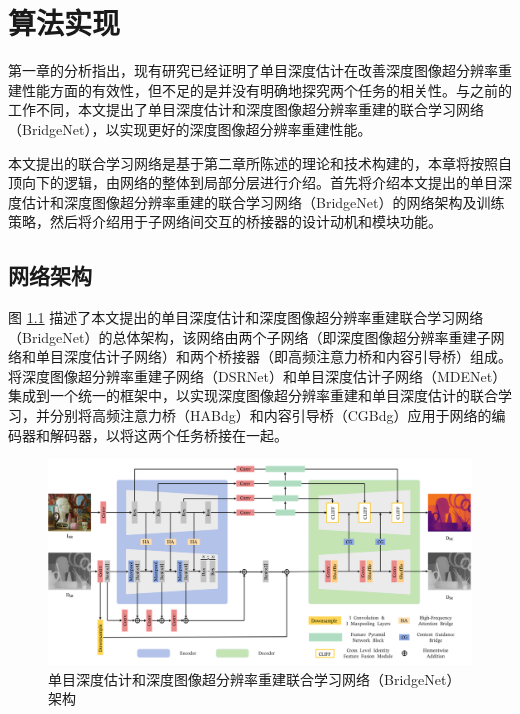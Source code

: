 \chapter{算法实现}

第一章的分析指出，现有研究已经证明了单目深度估计在改善深度图像超分辨率重建性能方面的有效性，但不足的是并没有明确地探究两个任务的相关性。与之前的工作不同，本文提出了单目深度估计和深度图像超分辨率重建的联合学习网络（BridgeNet），以实现更好的深度图像超分辨率重建性能。

本文提出的联合学习网络是基于第二章所陈述的理论和技术构建的，本章将按照自顶向下的逻辑，由网络的整体到局部分层进行介绍。首先将介绍本文提出的单目深度估计和深度图像超分辨率重建的联合学习网络（BridgeNet）的网络架构及训练策略，然后将介绍用于子网络间交互的桥接器的设计动机和模块功能。

\section{网络架构}

图 \ref{fig:fig3-1} 描述了本文提出的单目深度估计和深度图像超分辨率重建联合学习网络（BridgeNet）的总体架构，该网络由两个子网络（即深度图像超分辨率重建子网络和单目深度估计子网络）和两个桥接器（即高频注意力桥和内容引导桥）组成。将深度图像超分辨率重建子网络（DSRNet）和单目深度估计子网络（MDENet）集成到一个统一的框架中，以实现深度图像超分辨率重建和单目深度估计的联合学习，并分别将高频注意力桥（HABdg）和内容引导桥（CGBdg）应用于网络的编码器和解码器，以将这两个任务桥接在一起。

\begin{figure}[!htbp]
	\centering
	\includegraphics{figures/17.png}
	\caption{单目深度估计和深度图像超分辨率重建联合学习网络（BridgeNet）架构}
	\label{fig:fig3-1}
	\vspace{-0.8cm}  %
\end{figure}

